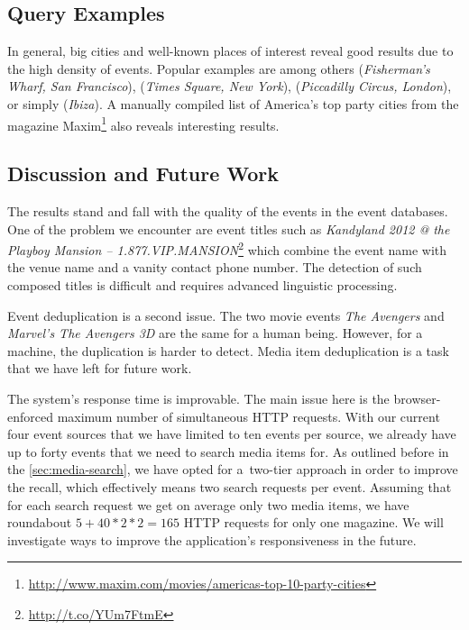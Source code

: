 \documentclass{acm_proc_article-sp}
\let\oldemph\emph
\renewcommand{\emph}[1]{\oldemph{\fontsize{9}{9}\selectfont #1}}
\begin{document}
{\subsection{Query Examples}
In general, big cities and well-known places of interest reveal good results due to the high density of events. Popular examples are among others (\emph{Fisherman's Wharf, San Francisco}), (\emph{Times Square, New York}), (\emph{Piccadilly Circus, London}), or simply (\emph{Ibiza}). A manually compiled list of America's top party cities from the magazine Maxim\footnote{\url{http://www.maxim.com/movies/americas-top-10-party-cities}} also reveals interesting results.

\subsection{Discussion and Future Work}
The results stand and fall with the quality of the events in the event databases. One of the problem we encounter are event titles such as
\emph{Kandyland 2012 @ the Playboy Mansion -- 1.877.VIP.MANSION}\footnote{\url{http://t.co/YUm7FtmE}} which combine the event name with the venue name
and a vanity contact phone number. The detection of such composed titles is difficult and requires advanced linguistic processing.

Event deduplication is a second issue. The two movie events \emph{The Avengers} and \emph{Marvel's The Avengers 3D} are the same for a human being. However, for a machine, the duplication is harder to detect. Media item deduplication is a task that we have left for future work.

The system's response time is improvable. The main issue here is the browser-enforced maximum number of simultaneous HTTP requests. With our current four event sources that we have limited to ten events per source, we already have up to forty events that we need to search media items for. As outlined before in the \autoref{sec:media-search}, we have opted for a~two-tier approach in order to improve the recall, which effectively means two search requests per event.
Assuming that for each search request we get on average only two media items, we have roundabout $5+40*2*2=165$ HTTP requests for only one magazine. We will investigate ways to improve the application's responsiveness in the future.


}
\end{document}
